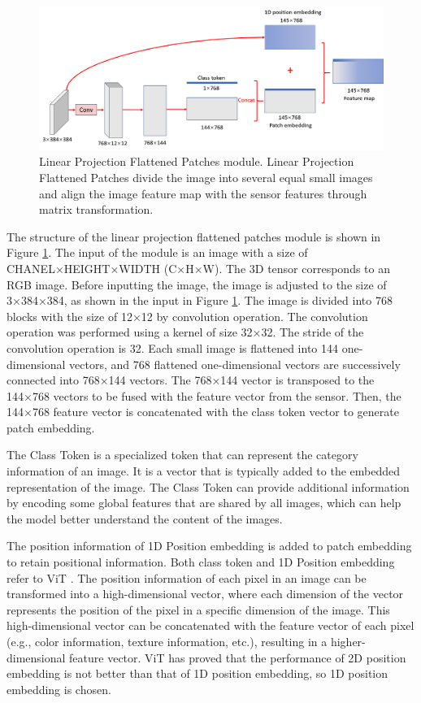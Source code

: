 \documentclass[acmsmall,manuscript, screen, review]{acmart}
\begin{document}
\begin{figure}[htbp]
  \centering
  \includegraphics[width=\linewidth]{pic/linear_projection_flattened_patches_module.png}
  \caption{Linear Projection Flattened Patches module. Linear Projection Flattened Patches divide the image into several equal small images and align the image feature map with the sensor features through matrix transformation.}
  \label{linear_projection}
\end{figure}

The structure of the linear projection flattened patches module is shown in Figure \ref{linear_projection}. The input of the module is an image with a size of CHANEL×HEIGHT×WIDTH (C×H×W). The 3D tensor corresponds to an RGB image. Before inputting the image, the image is adjusted to the size of 3×384×384, as shown in the input in Figure \ref{linear_projection}. The image is divided into 768 blocks with the size of 12×12 by convolution operation. The convolution operation was performed using a kernel of size 32×32. The stride of the convolution operation is 32. Each small image is flattened into 144 one-dimensional vectors, and 768 flattened one-dimensional vectors are successively connected into 768×144 vectors. The 768×144 vector is transposed to the 144×768 vectors to be fused with the feature vector from the sensor. Then, the 144×768 feature vector is concatenated with the class token vector to generate patch embedding. 

The Class Token is a specialized token that can represent the category information of an image. It is a vector that is typically added to the embedded representation of the image. The Class Token can provide additional information by encoding some global features that are shared by all images, which can help the model better understand the content of the images.

The position information of 1D Position embedding is added to patch embedding to retain positional information. Both class token and 1D Position embedding refer to ViT \cite{dosovitskiy_image_2021}. The position information of each pixel in an image can be transformed into a high-dimensional vector, where each dimension of the vector represents the position of the pixel in a specific dimension of the image. This high-dimensional vector can be concatenated with the feature vector of each pixel (e.g., color information, texture information, etc.), resulting in a higher-dimensional feature vector. ViT has proved that the performance of 2D position embedding is not better than that of 1D position embedding, so 1D position embedding is chosen. 
\end{document}
